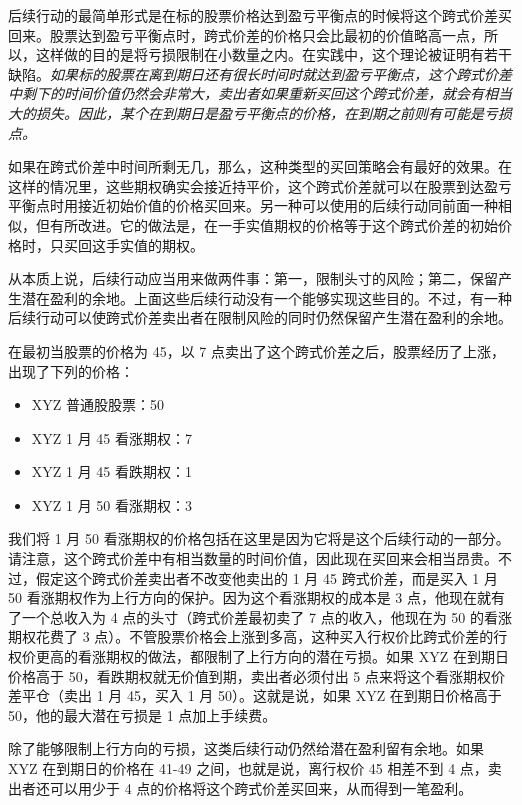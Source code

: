 后续行动的最简单形式是在标的股票价格达到盈亏平衡点的时候将这个跨式价差买回来。股票达到盈亏平衡点时，跨式价差的价格只会比最初的价值略高一点，所以，这样做的目的是将亏损限制在小数量之内。在实践中，这个理论被证明有若干缺陷。\textit{如果标的股票在离到期日还有很长时间时就达到盈亏平衡点，这个跨式价差中剩下的时间价值仍然会非常大，卖出者如果重新买回这个跨式价差，就会有相当大的损失。因此，某个在到期日是盈亏平衡点的价格，在到期之前则有可能是亏损点。}

如果在跨式价差中时间所剩无几，那么，这种类型的买回策略会有最好的效果。在这样的情况里，这些期权确实会接近持平价，这个跨式价差就可以在股票到达盈亏平衡点时用接近初始价值的价格买回来。另一种可以使用的后续行动同前面一种相似，但有所改进。它的做法是，在一手实值期权的价格等于这个跨式价差的初始价格时，只买回这手实值的期权。

从本质上说，后续行动应当用来做两件事：第一，限制头寸的风险；第二，保留产生潜在盈利的余地。上面这些后续行动没有一个能够实现这些目的。不过，有一种后续行动可以使跨式价差卖出者在限制风险的同时仍然保留产生潜在盈利的余地。
\begin{tcolorbox}
    在最初当股票的价格为 45，以 7 点卖出了这个跨式价差之后，股票经历了上涨，出现了下列的价格：
    \begin{itemize}
        \item XYZ 普通股股票：50
        \item XYZ 1 月 45 看涨期权：7
        \item XYZ 1 月 45 看跌期权：1
        \item XYZ 1 月 50 看涨期权：3
    \end{itemize}
\end{tcolorbox}
我们将 1 月 50 看涨期权的价格包括在这里是因为它将是这个后续行动的一部分。请注意，这个跨式价差中有相当数量的时间价值，因此现在买回来会相当昂贵。不过，假定这个跨式价差卖出者不改变他卖出的 1 月 45 跨式价差，而是买入 1 月 50 看涨期权作为上行方向的保护。因为这个看涨期权的成本是 3 点，他现在就有了一个总收入为 4 点的头寸（跨式价差最初卖了 7 点的收入，他现在为 50 的看涨期权花费了 3 点）。不管股票价格会上涨到多高，这种买入行权价比跨式价差的行权价更高的看涨期权的做法，都限制了上行方向的潜在亏损。如果 XYZ 在到期日价格高于 50，看跌期权就无价值到期，卖出者必须付出 5 点来将这个看涨期权价差平仓（卖出 1 月 45，买入 1 月 50）。这就是说，如果 XYZ 在到期日价格高于 50，他的最大潜在亏损是 1 点加上手续费。

除了能够限制上行方向的亏损，这类后续行动仍然给潜在盈利留有余地。如果 XYZ 在到期日的价格在 41-49 之间，也就是说，离行权价 45 相差不到 4 点，卖出者还可以用少于 4 点的价格将这个跨式价差买回来，从而得到一笔盈利。

